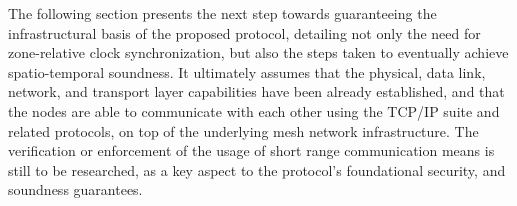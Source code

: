 The following section presents the next step towards guaranteeing the infrastructural basis of the proposed \pol{} protocol, detailing not only the need for zone-relative clock synchronization, but also the steps taken to eventually achieve spatio-temporal soundness. It ultimately assumes that the physical, data link, network, and transport layer capabilities have been already established, and that the nodes are able to communicate with each other using the TCP/IP suite and related protocols, on top of the underlying mesh network infrastructure. The verification or enforcement of the usage of short range communication means is still to be researched, as a key aspect to the protocol's foundational security, and soundness guarantees.